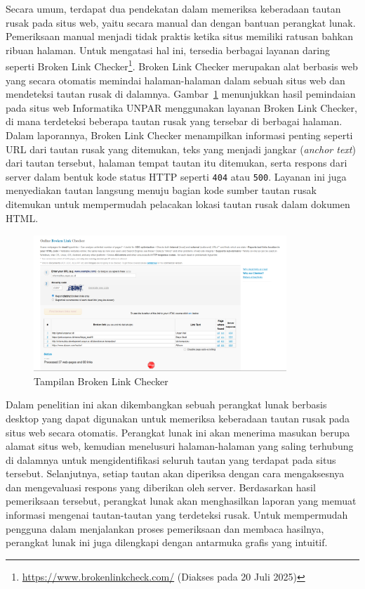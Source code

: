 Secara umum, terdapat dua pendekatan dalam memeriksa keberadaan tautan rusak pada situs web, yaitu secara manual dan dengan bantuan perangkat lunak. Pemeriksaan manual menjadi tidak praktis ketika situs memiliki ratusan bahkan ribuan halaman. Untuk mengatasi hal ini, tersedia berbagai layanan daring seperti Broken Link Checker\footnote{\url{https://www.brokenlinkcheck.com/} (Diakses pada 20 Juli 2025)}. Broken Link Checker merupakan alat berbasis web yang secara otomatis memindai halaman-halaman dalam sebuah situs web dan mendeteksi tautan rusak di dalamnya. Gambar~\ref{fig:gambar-contoh-brokenlinkcheck} menunjukkan hasil pemindaian pada situs web Informatika UNPAR menggunakan layanan Broken Link Checker, di mana terdeteksi beberapa tautan rusak yang tersebar di berbagai halaman. Dalam laporannya, Broken Link Checker menampilkan informasi penting seperti URL dari tautan rusak yang ditemukan, teks yang menjadi jangkar (\textit{anchor text}) dari tautan tersebut, halaman tempat tautan itu ditemukan, serta respons dari server dalam bentuk kode status HTTP seperti \texttt{404} atau \texttt{500}. Layanan ini juga menyediakan tautan langsung menuju bagian kode sumber tautan rusak ditemukan untuk mempermudah pelacakan lokasi tautan rusak dalam dokumen HTML.

\begin{figure}[H]
    \centering
    \includegraphics[width=0.85\textwidth]{Gambar/010100-broken-link-checker.png}
    \caption{Tampilan Broken Link Checker}
    \label{fig:gambar-contoh-brokenlinkcheck}
\end{figure}


Dalam penelitian ini akan dikembangkan sebuah perangkat lunak berbasis desktop yang dapat digunakan untuk memeriksa keberadaan tautan rusak pada situs web secara otomatis. Perangkat lunak ini akan menerima masukan berupa alamat situs web, kemudian menelusuri halaman-halaman yang saling terhubung di dalamnya untuk mengidentifikasi seluruh tautan yang terdapat pada situs tersebut. Selanjutnya, setiap tautan akan diperiksa dengan cara mengaksesnya dan mengevaluasi respons yang diberikan oleh server. Berdasarkan hasil pemeriksaan tersebut, perangkat lunak akan menghasilkan laporan yang memuat informasi mengenai tautan-tautan yang terdeteksi rusak. Untuk mempermudah pengguna dalam menjalankan proses pemeriksaan dan membaca hasilnya, perangkat lunak ini juga dilengkapi dengan antarmuka grafis yang intuitif.